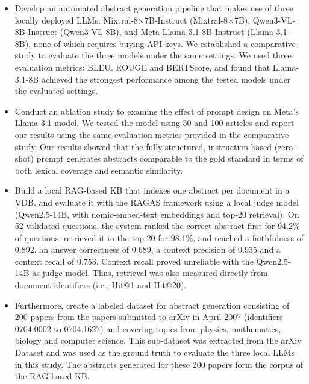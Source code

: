 \documentclass[bdcc,article,submit,pdftex,moreauthors]{Definitions/mdpi}
\newif\ifshowchanges
\newcommand{\nkdel}[1]{\ifshowchanges{\color{red}\sout{#1}}\fi}
\newif\ifshowchanges
\DeclareRobustCommand{\nkdel}[1]{\ifshowchanges{\color{red}\sout{#1}}\fi}
\begin{document}
\begin{itemize}[labelsep=2.5mm,topsep=-3pt]

\item Develop an automated abstract generation pipeline that makes use of three locally deployed LLMs: Mixtral-8$\times$7B-Instruct (Mixtral-8$\times$7B), Qwen3-VL-8B-Instruct (Qwen3-VL-8B), and Meta-Llama-3.1-8B-Instruct (Llama-3.1-8B), none of which requires buying API keys. We established a comparative study to evaluate the three models under the same settings. We used three evaluation metrics: BLEU, ROUGE and BERTScore, and found that Llama-3.1-8B achieved the strongest performance among the tested models under the evaluated settings.

\item Conduct an ablation study to examine the effect of prompt design on Meta's Llama-3.1 model. We tested the model using 50 and 100 articles and report our results using the same evaluation metrics provided in the comparative study. Our results showed that the fully structured, instruction-based (zero-shot) prompt generates abstracts comparable to the gold standard in terms of both lexical coverage and semantic similarity.

\item %
Build a local RAG-based KB that indexes one abstract per document in a VDB, and evaluate it with the RAGAS framework using a local judge model (Qwen2.5-14B, with nomic-embed-text embeddings and top-20 retrieval). On 52 validated questions, the system ranked the correct abstract first for 94.2\% of questions, retrieved it in the top 20 for 98.1\%, and reached a faithfulness of 0.892, an answer correctness of 0.689, a context precision of 0.935 and a context recall of 0.753. 
Context recall proved unreliable with the Qwen2.5-14B as judge model. Thus, retrieval was also measured directly from document identifiers (i.e., Hit@1 and Hit@20).

\item Furthermore, create a labeled dataset for abstract generation consisting of 200 papers from the papers
submitted to arXiv in April 2007 (identifiers 0704.0002 to 0704.1627) and covering topics from  physics, mathematics, biology and computer science. 
This sub-dataset was extracted from the arXiv Dataset and was used as the ground truth to evaluate the three local LLMs in this study. The abstracts generated for these 200 papers form the corpus of the RAG-based KB.


\end{itemize}
\end{document}
